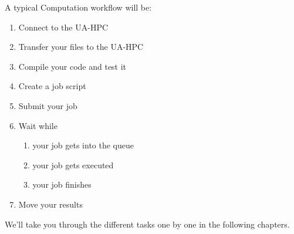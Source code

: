 A typical Computation workflow will be:

\begin{enumerate}
  \item  Connect to the UA-HPC
  \item  Transfer your files to the UA-HPC
  \item  Compile your code and test it
  \item  Create a job script
  \item  Submit your job
  \item  Wait while
  \begin{enumerate}
    \item  your job gets into the queue
    \item  your job gets executed
    \item  your job finishes
  \end{enumerate}
  \item  Move your results
\end{enumerate}

We'll take you through the different tasks one by one in the following
chapters.
